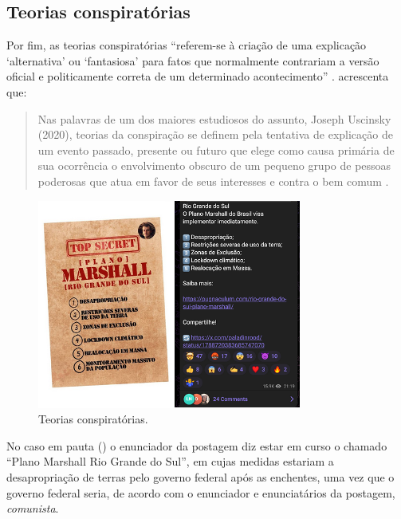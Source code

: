 \documentclass[portuguese]{textolivre}
\begin{document}
\subsection{Teorias conspiratórias}
Por fim, as teorias conspiratórias ``referem-se à criação de uma explicação `alternativa' ou `fantasiosa' para fatos que normalmente contrariam a versão oficial e politicamente correta de um determinado acontecimento'' \cite[p. 2]{rezende2019}. \textcite{aggio2021} acrescenta que:

\begin{quote}
    Nas palavras de um dos maiores estudiosos do assunto, Joseph Uscinsky (2020), teorias da conspiração se definem pela tentativa de explicação de um evento passado, presente ou futuro que elege como causa primária de sua ocorrência o envolvimento obscuro de um pequeno grupo de pessoas poderosas que atua em favor de seus interesses e contra o bem comum \cite[p. 67]{aggio2021}. 
\end{quote}

\begin{figure}[ht]
    \centering
    \begin{minipage}{.60\textwidth}
        \centering
        \includegraphics[width=\textwidth]{Imagens/Fig26.png}
        \caption{Teorias conspiratórias.}
        \label{fig-43}
    \end{minipage}
    \end{figure}
    
No caso em pauta () o enunciador da postagem diz estar em curso o chamado ``Plano Marshall Rio Grande do Sul'', em cujas medidas estariam a desapropriação de terras pelo governo federal após as enchentes, uma vez que o governo federal seria, de acordo com o enunciador e enunciatários da postagem, \emph{comunista}.
\end{document}
